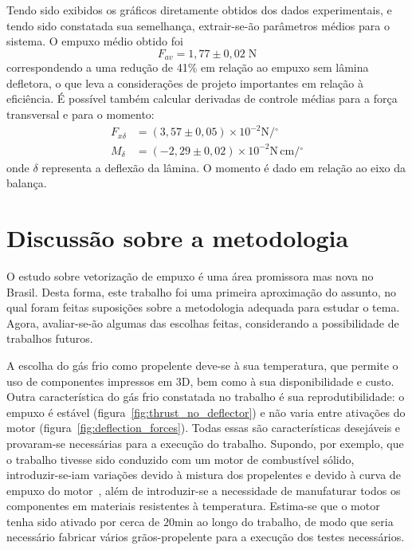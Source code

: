 Tendo sido exibidos os gráficos diretamente obtidos dos dados experimentais, e tendo sido constatada sua semelhança, extrair-se-ão parâmetros médios para o sistema. O empuxo médio obtido foi 
\begin{equation}
    F_{av} = 1,77 \pm 0,02\;\mathrm{N}
\end{equation}
correspondendo a uma redução de 41\% em relação ao empuxo sem lâmina defletora, o que leva a considerações de projeto importantes em relação à eficiência. É possível também calcular derivadas de controle médias para a força transversal e para o momento:
\begin{align}
    F_{x\delta} &= (3,57 \pm 0,05)\times10^{-2} \mathrm{N} / \mathrm{^\circ} \\
    M_\delta &= (-2,29 \pm 0,02)\times10^{-2} \mathrm{N}\,\mathrm{cm} / \mathrm{^\circ}
\end{align}
onde \(\delta \) representa a deflexão da lâmina. O momento é dado em relação ao eixo da balança.\ 

\section{Discussão sobre a metodologia}\label{sec:discussion}

O estudo sobre vetorização de empuxo é uma área promissora mas nova no Brasil. Desta forma, este trabalho foi uma primeira aproximação do assunto, no qual foram feitas suposições sobre a metodologia adequada para estudar o tema. Agora, avaliar-se-ão algumas das escolhas feitas, considerando a possibilidade de trabalhos futuros.

A escolha do gás frio como propelente deve-se à sua temperatura, que permite o uso de componentes impressos em 3D, bem como à sua disponibilidade e custo. Outra característica do gás frio constatada no trabalho é sua reprodutibilidade: o empuxo é estável (figura~\ref{fig:thrust_no_deflector}) e não varia entre ativações do motor (figura~\ref{fig:deflection_forces}). Todas essas são características desejáveis e provaram-se necessárias para a execução do trabalho. Supondo, por exemplo, que o trabalho tivesse sido conduzido com um motor de combustível sólido, introduzir-se-iam variações devido à mistura dos propelentes e devido à curva de empuxo do motor~\cite{Sutton}, além de introduzir-se a necessidade de manufaturar todos os componentes em materiais resistentes à temperatura. Estima-se que o motor tenha sido ativado por cerca de \(20\mathrm{min}\) ao longo do trabalho, de modo que seria necessário fabricar vários grãos-propelente para a execução dos testes necessários.

